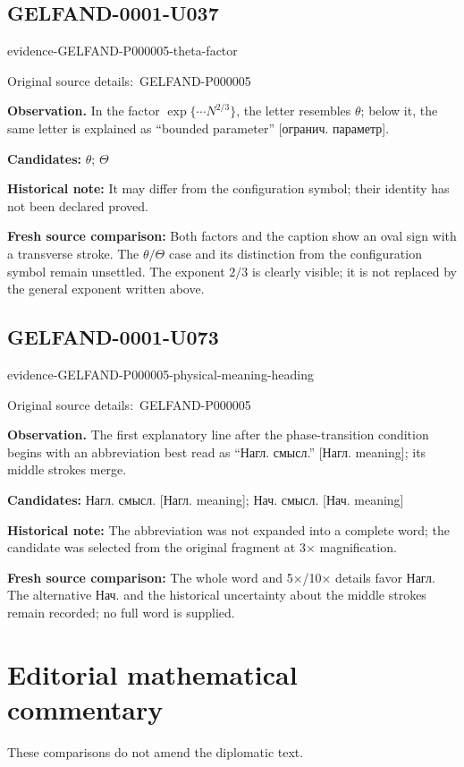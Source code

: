 \documentclass[11pt]{article}
\newcommand{\EvidenceBlock}[4]{%
 \par\smallskip\noindent\begin{minipage}{\linewidth}
 \begin{minipage}[t]{.47\linewidth}\vspace{0pt}\centering
 \csname evidence-#1-#2\endcsname\par
 {\scriptsize\SourceCropCaption\ #1}\par
 \end{minipage}\hfill
 \begin{minipage}[t]{.49\linewidth}\vspace{0pt}\raggedright
 {\small\color{orange!65!black}\textbf{#4} #3}\par
 \end{minipage}
 \end{minipage}\par\smallskip}
\newcommand{\SourceCropCaption}{Original source details:}\newcommand{\ReadingCaption}{Uncertain reading.}\newcommand{\IncompleteCaption}{Undeciphered passage.}\newcommand{\DiagramCaption}{Diagram and typed description.}
\begin{document}
\subsection*{GELFAND-0001-U037}
\EvidenceBlock{GELFAND-P000005}{theta-factor}{In the factor \(\exp\{\cdots N^{2/3}\}\), the letter resembles \(\theta\); below it, the same letter is explained as “bounded parameter” [огранич. параметр].}{Observation.}
\par\smallskip\noindent\textbf{Candidates: } \(\theta\); \(\Theta\)\par
\par\smallskip\noindent\textbf{Historical note: } It may differ from the configuration symbol; their identity has not been declared proved.\par
\par\smallskip\noindent\textbf{Fresh source comparison: } Both factors and the caption show an oval sign with a transverse stroke. The \(\theta/\Theta\) case and its distinction from the configuration symbol remain unsettled. The exponent \(2/3\) is clearly visible; it is not replaced by the general exponent written above.\par

\subsection*{GELFAND-0001-U073}
\EvidenceBlock{GELFAND-P000005}{physical-meaning-heading}{The first explanatory line after the phase-transition condition begins with an abbreviation best read as “Нагл. смысл.” [Нагл. meaning]; its middle strokes merge.}{Observation.}
\par\smallskip\noindent\textbf{Candidates: } Нагл. смысл. [Нагл. meaning]; Нач. смысл. [Нач. meaning]\par
\par\smallskip\noindent\textbf{Historical note: } The abbreviation was not expanded into a complete word; the candidate was selected from the original fragment at 3× magnification.\par
\par\smallskip\noindent\textbf{Fresh source comparison: } The whole word and 5×/10× details favor Нагл. The alternative Нач. and the historical uncertainty about the middle strokes remain recorded; no full word is supplied.\par
\clearpage\section*{Editorial mathematical commentary}
These comparisons do not amend the diplomatic text.
\end{document}
